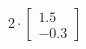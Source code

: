 \documentclass[preview]{standalone}
\begin{document}
\begin{align*}
2 \cdot \begin{bmatrix} 1.5 \\ -0.3 \end{bmatrix}
\end{align*}
\end{document}
